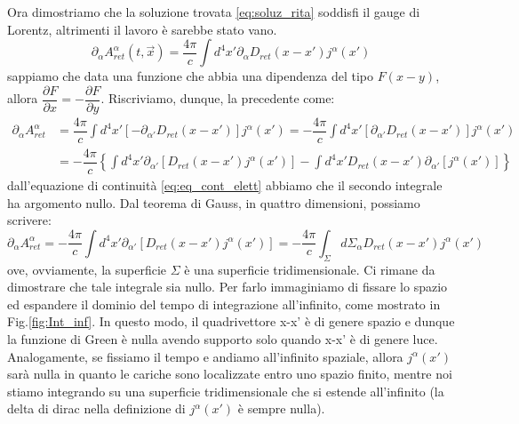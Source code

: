 Ora dimostriamo che la soluzione trovata \eqref{eq:soluz_rita} soddisfi il gauge di Lorentz, altrimenti il lavoro è sarebbe stato vano.\begin{equation}
  \partial_\alpha A_{ret}^\alpha(t,\Vec{x})=\dfrac{4\pi}{c}\int d^4x'\partial_\alpha D_{ret}(x-x')j^\alpha(x')
\end{equation}
sappiamo che data una funzione che abbia una dipendenza del tipo $F(x-y)$, allora $\dfrac{\partial F}{\partial x}=-\dfrac{\partial F}{\partial y}$. Riscriviamo, dunque, la precedente come:
\begin{equation}
\begin{aligned}
     \partial_\alpha A_{ret}^\alpha&=\dfrac{4\pi}{c}\int d^4x'[-\partial_{\alpha'} D_{ret}(x-x')]j^\alpha(x')=-\dfrac{4\pi}{c}\int d^4x'[\partial_{\alpha'} D_{ret}(x-x')]j^\alpha(x')\\
     &=-\dfrac{4\pi}{c}\left\{\int d^4x'\partial_{\alpha'}[D_{ret}(x-x')j^\alpha(x')]-\int d^4x'D_{ret}(x-x')\partial_{\alpha'}[j^\alpha(x')]\right\}
\end{aligned}
\end{equation}
dall'equazione di continuità \eqref{eq:eq_cont_elett} abbiamo che il secondo integrale ha argomento nullo. Dal teorema di Gauss, in quattro dimensioni, possiamo scrivere:
\begin{equation}
     \partial_\alpha A_{ret}^\alpha=-\dfrac{4\pi}{c}\int d^4x'\partial_{\alpha'}[D_{ret}(x-x')j^\alpha(x')]=-\dfrac{4\pi}{c}\int_\Sigma d\Sigma_\alpha D_{ret}(x-x')j^\alpha(x')
\end{equation}
ove, ovviamente, la superficie $\Sigma$ è una superficie tridimensionale. Ci rimane da dimostrare che tale integrale sia nullo. Per farlo immaginiamo di fissare lo spazio ed espandere il dominio del tempo di integrazione all'infinito, come mostrato in Fig.\ref{fig:Int_inf}. In questo modo, il quadrivettore x-x' è di genere spazio e dunque la funzione di Green è nulla avendo supporto solo quando x-x' è di genere luce. Analogamente, se fissiamo il tempo e andiamo all'infinito spaziale, allora $j^\alpha(x')$ sarà nulla in quanto le cariche sono localizzate entro uno spazio finito, mentre noi stiamo integrando su una superficie tridimensionale che si estende all'infinito (la delta di dirac nella definizione di $j^\alpha(x')$ è sempre nulla).

